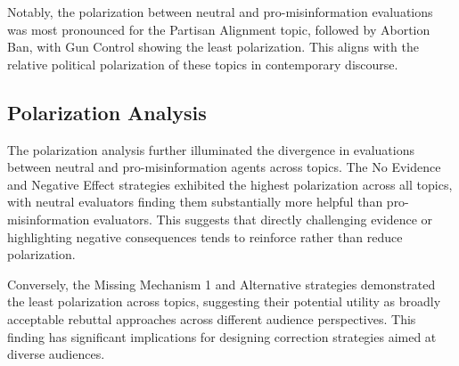 \documentclass[twocolumn]{article}
\begin{document}
Notably, the polarization between neutral and pro-misinformation evaluations was most pronounced for the Partisan Alignment topic, followed by Abortion Ban, with Gun Control showing the least polarization. This aligns with the relative political polarization of these topics in contemporary discourse.

\subsection{Polarization Analysis}

The polarization analysis further illuminated the divergence in evaluations between neutral and pro-misinformation agents across topics. The No Evidence and Negative Effect strategies exhibited the highest polarization across all topics, with neutral evaluators finding them substantially more helpful than pro-misinformation evaluators. This suggests that directly challenging evidence or highlighting negative consequences tends to reinforce rather than reduce polarization.

Conversely, the Missing Mechanism 1 and Alternative strategies demonstrated the least polarization across topics, suggesting their potential utility as broadly acceptable rebuttal approaches across different audience perspectives. This finding has significant implications for designing correction strategies aimed at diverse audiences.
\end{document}
